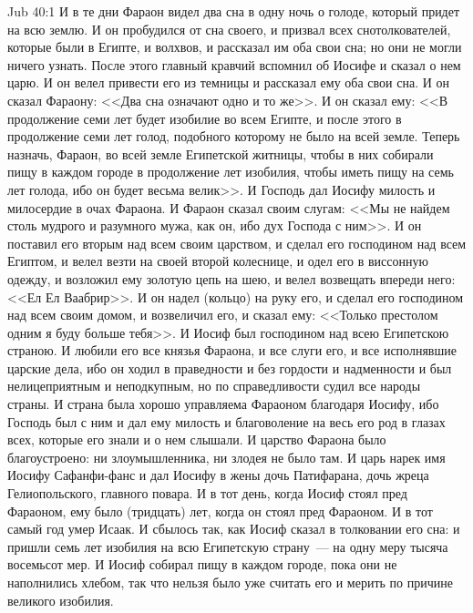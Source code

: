 \vs Jub 40:1
И в те дни Фараон видел два сна в одну ночь о
голоде, который придет на всю землю. И он
пробудился от сна своего, и призвал всех
снотолкователей, которые были в Египте, и
волхвов, и рассказал им оба свои сна; но они не
могли ничего узнать. После этого главный кравчий
вспомнил об Иосифе и сказал о нем царю. И он велел
привести его из темницы и рассказал ему оба свои
сна. И он сказал Фараону: <<Два сна означают одно
и то же>>. И он сказал ему: <<В продолжение семи
лет будет изобилие во всем Египте, и после этого в
продолжение семи лет голод, подобного которому
не было на всей земле. Теперь назначь, Фараон, во
всей земле Египетской житницы, чтобы в них
собирали пищу в каждом городе в продолжение лет
изобилия, чтобы иметь пищу на семь лет голода, ибо
он будет весьма велик>>. И Господь дал Иосифу
милость и милосердие в очах Фараона. И Фараон
сказал своим слугам: <<Мы не найдем столь мудрого
и разумного мужа, как он, ибо дух Господа с ним>>.
И он поставил его вторым над всем своим царством,
и сделал его господином над всем Египтом, и велел
везти на своей второй колеснице, и одел его в
виссонную одежду, и возложил ему золотую цепь на
шею, и велел возвещать впереди него: <<Ел Ел
Ваабрир>>. И он надел (кольцо) на руку его, и
сделал его господином над всем своим домом, и
возвеличил его, и сказал ему: <<Только престолом
одним я буду больше тебя>>. И Иосиф был
господином над всею Египетскою страною. И любили
его все князья Фараона, и все слуги его, и все
исполнявшие царские дела, ибо он ходил в
праведности и без гордости и надменности и был
нелицеприятным и неподкупным, но по
справедливости судил все народы страны. И страна
была хорошо управляема Фараоном благодаря
Иосифу, ибо Господь был с ним и дал ему милость и
благоволение на весь его род в глазах всех,
которые его знали и о нем слышали. И царство
Фараона было благоустроено: ни злоумышленника,
ни злодея не было там. И царь нарек имя Иосифу
Сафанфи-фанс и дал Иосифу в жены дочь Патифарана,
дочь жреца Гелиопольского, главного повара. И в
тот день, когда Иосиф стоял пред Фараоном, ему
было (тридцать) лет, когда он стоял пред
Фараоном. И в тот самый год умер Исаак. И сбылось
так, как Иосиф сказал в толковании его сна: и
пришли семь лет изобилия на всю Египетскую
страну~--- на одну меру тысяча восемьсот мер. И
Иосиф собирал пищу в каждом городе, пока они
не наполнились хлебом, так что нельзя было уже
считать его и мерить по причине великого
изобилия.

